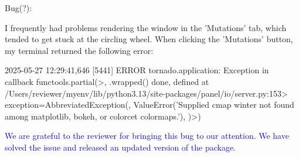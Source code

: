 \documentclass{article}
\begin{document}
Bug(?):

I frequently had problems rendering the window in the 'Mutations' tab, which tended to get stuck at the 
circling wheel. When clicking the 'Mutations' button, my terminal returned the following error:

2025-05-27 12:29:41,646 [5441] ERROR    tornado.application: Exception in callback functools.partial(>, .wrapped() 
done, defined at \\
/Users/reviewer/myenv/lib/python3.13/site-packages/panel/io/server.py:153> 
exception=AbbreviatedException(, ValueError('Supplied cmap winter not found among matplotlib, bokeh, or colorcet 
colormaps.'), )>)

\textcolor{blue}{We are grateful to the reviewer for bringing this bug to our attention. 
We have solved the issue and released an updated version of the package.}
\end{document}
